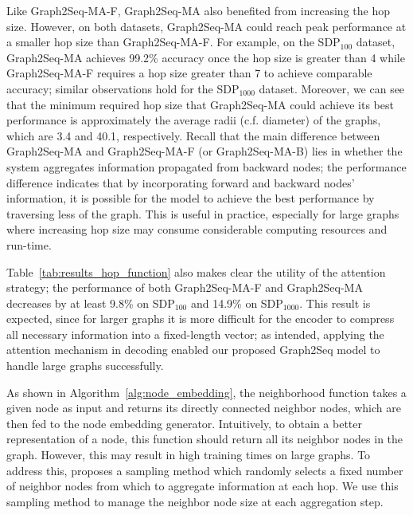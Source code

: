 \documentclass{article} \usepackage{iclr2019_conference,times}
\begin{document}
Like Graph2Seq-MA-F, Graph2Seq-MA also benefited from increasing the hop size. However, on both datasets, Graph2Seq-MA could reach peak performance at a smaller hop size than Graph2Seq-MA-F. For example, on the SDP$_{100}$ dataset, Graph2Seq-MA achieves 99.2\% accuracy once the hop size is greater than 4 while Graph2Seq-MA-F requires a hop size greater than 7 to achieve comparable accuracy; similar observations hold for the SDP$_{1000}$ dataset.
Moreover, we can see that the minimum required hop size that Graph2Seq-MA could achieve its best performance is approximately the average radii (c.f. diameter) of the graphs, which are 3.4 and 40.1, respectively.
Recall that the main difference between Graph2Seq-MA and Graph2Seq-MA-F (or Graph2Seq-MA-B) lies in whether the system aggregates information propagated from backward nodes; the performance difference indicates that by incorporating forward and backward nodes' information, it is possible for the model to achieve the best performance by traversing less of the graph. This is useful in practice, especially for large graphs where increasing hop size may consume considerable computing resources and run-time.

Table~\ref{tab:results_hop_function} also makes clear the utility of the attention strategy; the performance of both Graph2Seq-MA-F and Graph2Seq-MA decreases by at least 9.8\% on SDP$_{100}$ and 14.9\% on SDP$_{1000}$. This result is expected, since for larger graphs it is more difficult for the encoder to compress all necessary information into a fixed-length vector; as intended, applying the attention mechanism in decoding enabled our proposed Graph2Seq model to handle large graphs successfully.

As shown in Algorithm~\ref{alg:node_embedding}, the neighborhood function takes a given node as input and returns its
directly connected neighbor nodes, which are then fed to the node embedding generator.
Intuitively, to obtain a better representation of a node, this function should return all its neighbor nodes in the graph. However, this may result in high training times on large graphs.
To address this, \citep{hamilton2017inductive} proposes a sampling method which randomly selects
a fixed number of neighbor nodes from which to aggregate information at each hop.
We use this sampling method to manage the neighbor node size at each aggregation step.
\end{document}
